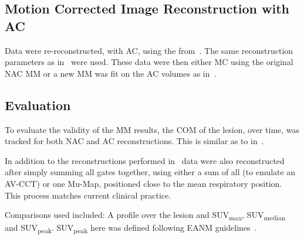             \subsection{Motion Corrected Image Reconstruction with AC} \label{sec:pet_ct_respiratory_motion_correction_with_a_single_attenuation_map_using_nac_derived_deformation_fields_methods_attenuation_corrected_image_reconstruction}
                Data were re-reconstructed, with \gls{AC}, using the  from~. The same reconstruction parameters as in~ were used. These data were then either \gls{MC} using the original \gls{NAC} \gls{MM} or a new \gls{MM} was fit on the \gls{AC} volumes as in~.
            
            \subsection{Evaluation} \label{sec:pet_ct_respiratory_motion_correction_with_a_single_attenuation_map_using_nac_derived_deformation_fields_methods_evaluation}
                To evaluate the validity of the \gls{MM} results, the \gls{COM} of the lesion, over time, was tracked for both \gls{NAC} and \gls{AC} reconstructions. This is similar as to in~.
                
                In addition to the reconstructions performed in~ data were also reconstructed after simply summing all gates together, using either a sum of all  (to emulate an \gls{AV-CCT}) or one \gls{Mu-Map}, positioned close to the mean respiratory position. This process matches current clinical practice. 
                
                Comparisons used included: A profile over the lesion and \gls{SUV}\textsubscript{max}, \gls{SUV}\textsubscript{median} and \gls{SUV}\textsubscript{peak}. \gls{SUV}\textsubscript{peak} here was defined following \gls{EANM} guidelines~\parencite{Boellaard2015FDG2.0}.
            
